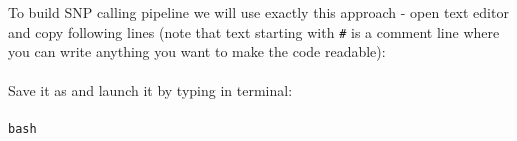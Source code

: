 To build SNP calling pipeline we will use exactly this approach -
open text editor and copy following lines (note that text starting
with \texttt{\#} is a comment line where you can write anything you want to make
the code readable):\\~\\

Save it as \texttt{\pipename} and launch it by typing in terminal:\\~\\
\texttt{bash \pipename}\\

